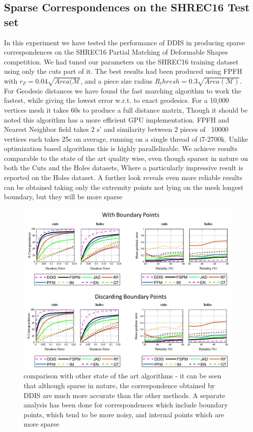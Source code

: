 \documentclass[10pt,twocolumn,letterpaper]{article}
\begin{document}
\subsection{Sparse Correspondences on the SHREC16 Test set}
In this experiment we have tested the performance of DDIS in producing sparse correspondences on the SHREC16 Partial Matching of Deformable Shapes competition. 
We had tuned our parameters on the SHREC16 training dataset using only the cuts part of it. The best results had been produced using FPFH with $r_F = 0.04\sqrt{Area(\mathcal{M}}$, and a piece size radius $R_thresh=0.3\sqrt{Area(\mathcal{M})}$. For Geodesic distances we have found the fast marching algorithm to work the fastest, while giving the lowest error w.r.t. to exact geodesics. For a 10,000 vertices mesh it takes 60s to produce a full distance matrix, Though it should be noted this algorithm has a more efficient GPU implementation. FPFH and Nearest Neighbor field takes 2 s' and similarity between 2 pieces of ~10000 vertices each takes 25s on average, running on a single thread of i7-2700k. Unlike optimization based algorithms this is highly parallelizable.
We achieve results comparable to the state of the art \cite{litany2017fully} quality wise, even though sparser in nature on both the Cuts and the Holes datasets, Where a particularly impressive result is reported on the Holes dataset. A further look reveals even more reliable results can be obtained taking only the extremity points not lying on the mesh longest boundary, but they will be more sparse

\begin{figure}[htb]
	\centering

	\includegraphics[width=1\textwidth]{figures/ROCSHREC16.png}
	\caption{comparison with other state of the art algorithms - it can be seen that although sparse in nature, the correspondence obtained by DDIS are much more accurate than the other methods. 
		A separate analysis has been done for correspondences which include boundary points, which tend to be more noisy, and internal points which are more sparse}
\end{figure}
\end{document}
